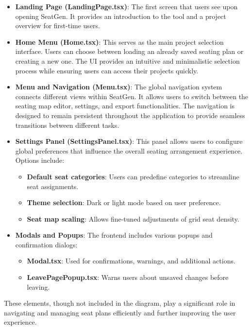 \begin{itemize}
    \item \textbf{Landing Page (LandingPage.tsx)}: The first screen that users see upon opening SeatGen. It provides an introduction to the tool and a project overview for first-time users.
    
    \item \textbf{Home Menu (Home.tsx)}: This serves as the main project selection interface. Users can choose between loading an already saved seating plan or creating a new one. The UI provides an intuitive and minimalistic selection process while ensuring users can access their projects quickly.
    
    \item \textbf{Menu and Navigation (Menu.tsx)}: The global navigation system connects different views within SeatGen. It allows users to switch between the seating map editor, settings, and export functionalities. The navigation is designed to remain persistent throughout the application to provide seamless transitions between different tasks.
    
    \item \textbf{Settings Panel (SettingsPanel.tsx)}: This panel allows users to configure global preferences that influence the overall seating arrangement experience. Options include:
    \begin{itemize}
        \item \textbf{Default seat categories}: Users can predefine categories to streamline seat assignments.
        \item \textbf{Theme selection}: Dark or light mode based on user preference.
        \item \textbf{Seat map scaling}: Allows fine-tuned adjustments of grid seat density.
    \end{itemize}
    
    \item \textbf{Modals and Popups}: The frontend includes various popups and confirmation dialogs:
    \begin{itemize}
        \item \textbf{Modal.tsx}: Used for confirmations, warnings, and additional actions.
        \item \textbf{LeavePagePopup.tsx}: Warns users about unsaved changes before leaving.
    \end{itemize}
\end{itemize}

These elements, though not included in the diagram, play a significant role in navigating and managing seat plans efficiently and further improving the user experience.


